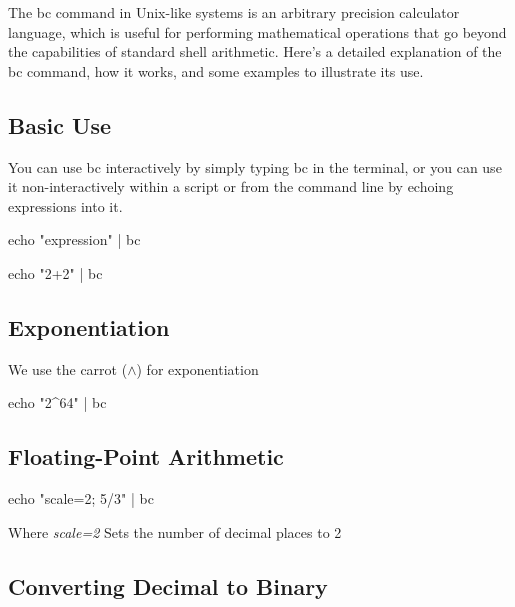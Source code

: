 \documentclass{report}
\begin{document}
    \pagebreak 
    \bigbreak \noindent 
    The bc command in Unix-like systems is an arbitrary precision calculator language, which is useful for performing mathematical operations that go beyond the capabilities of standard shell arithmetic. Here's a detailed explanation of the bc command, how it works, and some examples to illustrate its use.
    \bigbreak \noindent 
    \subsection{Basic Use}
    \bigbreak \noindent 
    You can use bc interactively by simply typing bc in the terminal, or you can use it non-interactively within a script or from the command line by echoing expressions into it.
    \bigbreak \noindent 
    \begin{bashcode}
    echo "expression" | bc

    echo "2+2" | bc
    \end{bashcode}
    \bigbreak \noindent 
    \subsection{Exponentiation}
    \bigbreak \noindent 
    We use the carrot ($\land$) for exponentiation
    \bigbreak \noindent 
    \begin{bashcode}
        echo "2^64" | bc
    \end{bashcode}

    \bigbreak \noindent 
    \subsection{Floating-Point Arithmetic}
    \bigbreak \noindent 
    \begin{bashcode}
    echo "scale=2; 5/3" | bc
    \end{bashcode}
    \bigbreak \noindent 
    Where \textit{scale=2} Sets the number of decimal places to 2

    \bigbreak \noindent 
    \subsection{Converting Decimal to Binary}
    \bigbreak \noindent 
\end{document}
